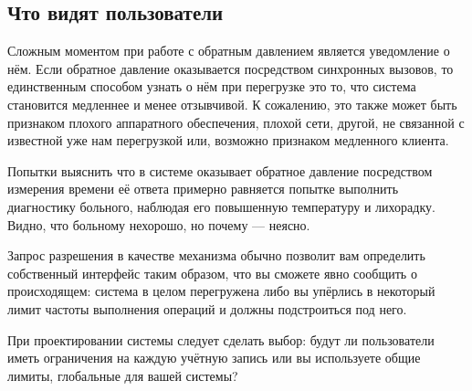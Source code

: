 \subsection{Что видят пользователи}

Сложным моментом при работе с обратным давлением является уведомление о нём. Если обратное давление оказывается посредством синхронных вызовов, то единственным способом узнать о нём при перегрузке это то, что система становится медленнее и менее отзывчивой. К сожалению, это также может быть признаком плохого аппаратного обеспечения, плохой сети, другой, не связанной с известной уже нам перегрузкой или, возможно признаком медленного клиента.

Попытки выяснить что в системе оказывает обратное давление посредством измерения времени её ответа примерно равняется попытке выполнить диагностику больного, наблюдая его повышенную температуру и лихорадку. Видно, что больному нехорошо, но почему --- неясно.

Запрос разрешения в качестве механизма обычно позволит вам определить собственный интерфейс таким образом, что вы сможете явно сообщить о происходящем: система в целом перегружена либо вы упёрлись в некоторый лимит частоты выполнения операций и должны подстроиться под него.

При проектировании системы следует сделать выбор: будут ли пользователи иметь ограничения на каждую учётную запись или вы используете общие лимиты, глобальные для вашей системы?

